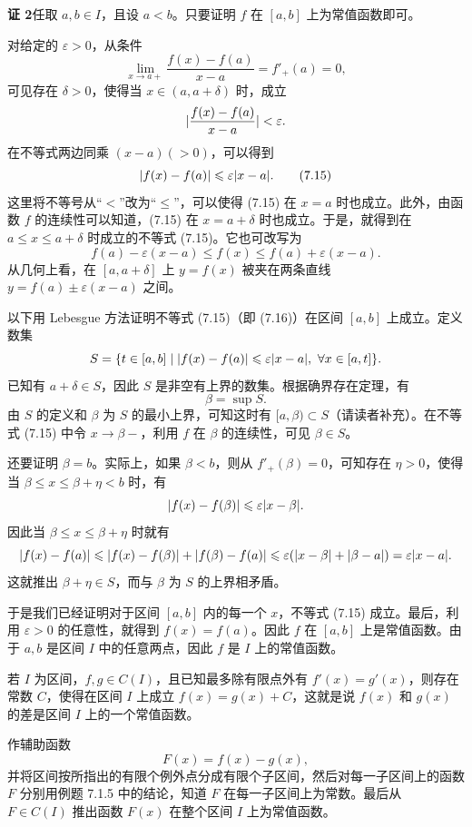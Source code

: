 \begin{xproof}
\textbf{证 2}\quad 任取 $a,b\in I$，且设 $a<b$。只要证明 $f$ 在 $[a,b]$ 上为常值函数即可。

对给定的 $\varepsilon>0$，从条件
\[
  \lim_{x\to a+}\frac{f(x)-f(a)}{x-a}=f'_+(a)=0,
\]
可见存在 $\delta>0$，使得当 $x\in(a,a+\delta)$ 时，成立
\[
  \lvert\frac{f(x)-f(a)}{x-a}\rvert<\varepsilon.
\]
在不等式两边同乘 $(x-a)(>0)$，可以得到
\begin{equation}
  \lvert f(x)-f(a)\rvert\leqslant\varepsilon\lvert x-a\rvert.
  \tag{7.15}
\end{equation}
这里将不等号从“$<$”改为“$\leqslant$”，可以使得 (7.15) 在 $x=a$ 时也成立。此外，由函数 $f$ 的连续性可以知道，(7.15) 在 $x=a+\delta$ 时也成立。于是，就得到在 $a\leqslant x\leqslant a+\delta$ 时成立的不等式 (7.15)。它也可改写为
\begin{equation}
  f(a)-\varepsilon(x-a)\leqslant f(x)\leqslant f(a)+\varepsilon(x-a).
  \tag{7.16}
\end{equation}
从几何上看，在 $[a,a+\delta]$ 上 $y=f(x)$ 被夹在两条直线 $y=f(a)\pm\varepsilon(x-a)$ 之间。

以下用 Lebesgue 方法证明不等式 (7.15)（即 (7.16)）在区间 $[a,b]$ 上成立。定义数集
\[
  S=\{t\in[a,b]\mid \lvert f(x)-f(a)\rvert\leqslant\varepsilon\lvert x-a\rvert,\ \forall x\in[a,t]\}.
\]
已知有 $a+\delta\in S$，因此 $S$ 是非空有上界的数集。根据确界存在定理，有
\[
  \beta=\sup S.
\]
由 $S$ 的定义和 $\beta$ 为 $S$ 的最小上界，可知这时有 $[a,\beta)\subset S$（请读者补充）。在不等式 (7.15) 中令 $x\to\beta-$，利用 $f$ 在 $\beta$ 的连续性，可见 $\beta\in S$。

还要证明 $\beta=b$。实际上，如果 $\beta<b$，则从 $f'_+(\beta)=0$，可知存在 $\eta>0$，使得当 $\beta\leqslant x\leqslant\beta+\eta<b$ 时，有
\[
  \lvert f(x)-f(\beta)\rvert\leqslant\varepsilon\lvert x-\beta\rvert.
\]
因此当 $\beta\leqslant x\leqslant\beta+\eta$ 时就有
\[
  \lvert f(x)-f(a)\rvert\leqslant\lvert f(x)-f(\beta)\rvert+\lvert f(\beta)-f(a)\rvert
  \leqslant\varepsilon(\lvert x-\beta\rvert+\lvert\beta-a\rvert)
  =\varepsilon\lvert x-a\rvert.
\]
这就推出 $\beta+\eta\in S$，而与 $\beta$ 为 $S$ 的上界相矛盾。

于是我们已经证明对于区间 $[a,b]$ 内的每一个 $x$，不等式 (7.15) 成立。最后，利用 $\varepsilon>0$ 的任意性，就得到 $f(x)=f(a)$。因此 $f$ 在 $[a,b]$ 上是常值函数。由于 $a,b$ 是区间 $I$ 中的任意两点，因此 $f$ 是 $I$ 上的常值函数。
\end{xproof}

\begin{xexample}[7.1.6（不定积分的基本定理）]
若 $I$ 为区间，$f,g\in C(I)$，且已知最多除有限点外有 $f'(x)=g'(x)$，则存在常数 $C$，使得在区间 $I$ 上成立 $f(x)=g(x)+C$，这就是说 $f(x)$ 和 $g(x)$ 的差是区间 $I$ 上的一个常值函数。
\end{xexample}
\begin{xproof}
作辅助函数
\[
  F(x)=f(x)-g(x),
\]
并将区间按所指出的有限个例外点分成有限个子区间，然后对每一子区间上的函数 $F$ 分别用例题 7.1.5 中的结论，知道 $F$ 在每一子区间上为常数。最后从 $F\in C(I)$ 推出函数 $F(x)$ 在整个区间 $I$ 上为常值函数。
\end{xproof}

